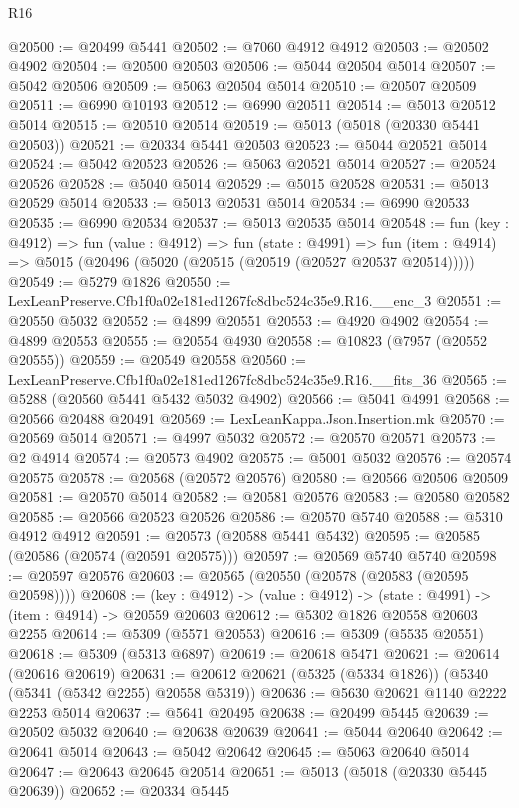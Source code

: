 \begin{lexlean}{R16}
\begin{coremodule}
@20500 := @20499 @5441
@20502 := @7060 @4912 @4912
@20503 := @20502 @4902
@20504 := @20500 @20503
@20506 := @5044 @20504 @5014
@20507 := @5042 @20506
@20509 := @5063 @20504 @5014
@20510 := @20507 @20509
@20511 := @6990 @10193
@20512 := @6990 @20511
@20514 := @5013 @20512 @5014
@20515 := @20510 @20514
@20519 := @5013 (@5018 (@20330 @5441 @20503))
@20521 := @20334 @5441 @20503
@20523 := @5044 @20521 @5014
@20524 := @5042 @20523
@20526 := @5063 @20521 @5014
@20527 := @20524 @20526
@20528 := @5040 @5014
@20529 := @5015 @20528
@20531 := @5013 @20529 @5014
@20533 := @5013 @20531 @5014
@20534 := @6990 @20533
@20535 := @6990 @20534
@20537 := @5013 @20535 @5014
@20548 := fun (key : @4912) =>
  fun (value : @4912) =>
  fun (state : @4991) =>
  fun (item : @4914) => @5015 (@20496 (@5020 (@20515 (@20519 (@20527 @20537 @20514)))))
@20549 := @5279 @1826
@20550 := LexLeanPreserve.Cfb1f0a02e181ed1267fc8dbc524c35e9.R16.__enc_3
@20551 := @20550 @5032
@20552 := @4899 @20551
@20553 := @4920 @4902
@20554 := @4899 @20553
@20555 := @20554 @4930
@20558 := @10823 (@7957 (@20552 @20555))
@20559 := @20549 @20558
@20560 := LexLeanPreserve.Cfb1f0a02e181ed1267fc8dbc524c35e9.R16.__fits_36
@20565 := @5288 (@20560 @5441 @5432 @5032 @4902)
@20566 := @5041 @4991
@20568 := @20566 @20488 @20491
@20569 := LexLeanKappa.Json.Insertion.mk
@20570 := @20569 @5014
@20571 := @4997 @5032
@20572 := @20570 @20571
@20573 := @2 @4914
@20574 := @20573 @4902
@20575 := @5001 @5032
@20576 := @20574 @20575
@20578 := @20568 (@20572 @20576)
@20580 := @20566 @20506 @20509
@20581 := @20570 @5014
@20582 := @20581 @20576
@20583 := @20580 @20582
@20585 := @20566 @20523 @20526
@20586 := @20570 @5740
@20588 := @5310 @4912 @4912
@20591 := @20573 (@20588 @5441 @5432)
@20595 := @20585 (@20586 (@20574 (@20591 @20575)))
@20597 := @20569 @5740 @5740
@20598 := @20597 @20576
@20603 := @20565 (@20550 (@20578 (@20583 (@20595 @20598))))
@20608 := (key : @4912) -> (value : @4912) -> (state : @4991) -> (item : @4914) -> @20559 @20603
@20612 := @5302 @1826 @20558 @20603 @2255
@20614 := @5309 (@5571 @20553)
@20616 := @5309 (@5535 @20551)
@20618 := @5309 (@5313 @6897)
@20619 := @20618 @5471
@20621 := @20614 (@20616 @20619)
@20631 := @20612 @20621 (@5325 (@5334 @1826)) (@5340 (@5341 (@5342 @2255) @20558 @5319))
@20636 := @5630 @20621 @1140 @2222 @2253 @5014
@20637 := @5641 @20495
@20638 := @20499 @5445
@20639 := @20502 @5032
@20640 := @20638 @20639
@20641 := @5044 @20640
@20642 := @20641 @5014
@20643 := @5042 @20642
@20645 := @5063 @20640 @5014
@20647 := @20643 @20645 @20514
@20651 := @5013 (@5018 (@20330 @5445 @20639))
@20652 := @20334 @5445

\end{coremodule}
\end{lexlean}
